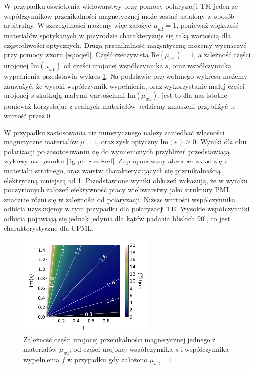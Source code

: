 W przypadku oświetlenia wielowarstwy przy pomocy polaryzacji TM jeden ze współczynników przenikalności magnetycznej może zostać ustalony w sposób arbitralny. W szczególności możemy więc założyć $\mu_{w2}=1$, ponieważ większość materiałów spotykanych w przyrodzie charakteryzuje się taką wartością dla częstotliwości optycznych. Drugą przenikalność magentyczną możemy wyznaczyć przy pomocy wzoru \ref{eq:oqe6}. Część rzeczywista $\textrm{Re}(\mu_{w1})=1$, a zależność części urojonej $\textrm{Im}(\mu_{w1})$ od części urojonej współczynnika $s$, oraz współczynnika wypełnienia przedstawia wykres \ref{fig:im-mu1}. Na podstawie przywołanego wykresu możemy zauważyć, że wysoki współczynnik wypełnienia, oraz wykorzystanie małej części urojonej $s$ skutkują małymi wartościami $\textrm{Im}(\mu_{w1})$, jest to dla nas istotne ponieważ korzystając z realnych materiałów będziemy zmuszeni przybliżyć te wartość przez $0$.

W przypadku zastosowania nie numerycznego należy zaniedbać własności magnetyczne materiałów $\mu=1$, oraz zysk optyczny $\textrm{Im}(\varepsilon)\ge0$. Wyniki dla obu polarizacji po zasotosowaniu się do wymienionych przybliżeń przedstawiają wykresy na rysunku \ref{fig:pml-real-ref}. Zaproponowany absorber skład się z materiału stratnego, oraz warstw charakteryzujących się przenikalnością elektryczną mniejszą od 1. Przedstawione wyniki obliczeń wskazują, że w wyniku poczynionych założeń efektywność pracy wielowarstwy jako struktury PML znacznie różni się w zależności od polaryzacji. Niższe wartości współczynnika odbicia uzyskujemy w tym przypadku dla polaryzacji TE. Wysokie współczynniki odbicia pojawiają się jednak jedynia dla kątów padania bliskich $90^{\circ}$, co jest charakterystyczne dla UPML.


\begin{figure}
	\includegraphics[width=0.6\textwidth]{images/pml/fig4.png}
	\caption{Zależność części urojonej przenikalności magnetycznej jednego z materiałów $\mu_{w1}$, od części urojonej współczynnika $s$ i współczynnika wypełnienia $f$ w przypadku gdy założono $\mu_{w2}=1$}
	\label{fig:im-mu1}
\end{figure}



